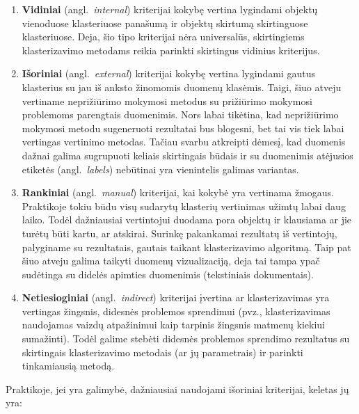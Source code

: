 \documentclass{VUMIFInfKursinis}
\newcommand{\ltang}[2]{#1 (angl.\  \textit{#2}) }
\begin{document}
\begin{enumerate}
\item
  \ltang{\textbf{Vidiniai}}{internal} kriterijai kokybę vertina
  lygindami objektų vienoduose klasteriuose panašumą ir objektų skirtumą
  skirtinguose klasteriuose. Deja, šio tipo kriterijai nėra universalūs,
  skirtingiems klasterizavimo metodams reikia parinkti skirtingus
  vidinius kriterijus.
\item
  \ltang{\textbf{Išoriniai}}{external} kriterijai kokybę vertina
  lygindami gautus klasterius su jau iš anksto žinomomis duomenų
  klasėmis. Taigi, šiuo atveju vertiname neprižiūrimo mokymosi metodus
  su prižiūrimo mokymosi problemoms parengtais duomenimis. Nors labai
  tikėtina, kad neprižiūrimo mokymosi metodu sugeneruoti rezultatai bus
  blogesni, bet tai vis tiek labai vertingas vertinimo metodas. Tačiau
  svarbu atkreipti dėmesį, kad duomenis dažnai galima sugrupuoti keliais
  skirtingais būdais ir su duomenimis atėjusios \ltang{etiketės}{labels} nebūtinai yra vienintelis galimas variantas. 
\item
  \ltang{\textbf{Rankiniai}}{manual} kriterijai, kai kokybė yra
  vertinama žmogaus. Praktikoje tokiu būdu visų sudarytų klasterių
  vertinimas užimtų labai daug laiko. Todėl dažniausiai vertintojui
  duodama pora objektų ir klausiama ar jie turėtų būti kartu, ar
  atskirai. Surinkę pakankamai rezultatų iš vertintojų, palyginame su
  rezultatais, gautais taikant klasterizavimo algoritmą. Taip pat šiuo
  atveju galima taikyti duomenų vizualizaciją, deja tai tampa ypač
  sudėtinga su didelės apimties duomenimis (tekstiniais dokumentais).
\item
  \ltang{\textbf{Netiesioginiai}}{indirect} kriterijai įvertina ar
  klasterizavimas yra vertingas žingsnis, didesnės problemos sprendimui
  (pvz., klasterizavimas naudojamas vaizdų atpažinimui kaip tarpinis
  žingsnis matmenų kiekiui sumažinti). Todėl galime stebėti didesnės
  problemos sprendimo rezultatus su skirtingais klasterizavimo metodais
  (ar jų parametrais) ir parinkti tinkamiausią metodą.
\end{enumerate}

Praktikoje, jei yra galimybė, dažniausiai naudojami išoriniai
kriterijai, keletas jų yra:
\end{document}

